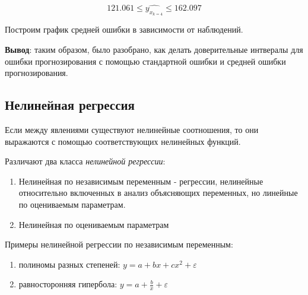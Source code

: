 \documentclass[aps,%
12pt,%
final,%
oneside,
onecolumn,%
musixtex, %
superscriptaddress,%
centertags]{article} %
\begin{document}
$$121.061 \leq \widehat{y_{x_{k=4}}} \leq162.097 $$

Построим график средней ошибки в зависимости от наблюдений.

\begin{center}
\end{center}

\textbf{Вывод}: таким образом, было разобрано, как делать доверительные интвералы для ошибки прогнозирования с помощью стандартной ошибки и средней ошибки прогнозирования.
\newpage
\subsection{Нелинейная регрессия}

Если между явлениями существуют нелинейные соотношения, то они выражаются с помощью соответствующих нелинейных функций.

Различают два класса \textit{нелинейной регрессии}:
\begin{enumerate}
	\item Нелинейная по независимым переменным - регрессии, нелинейные относительно включенных в анализ объясняющих переменных, но линейные по оцениваемым параметрам.
	\item Нелинейная по оцениваемым параметрам 
\end{enumerate}

Примеры нелинейной регрессии по независимым переменным:
\begin{enumerate}
	\item полиномы разных степеней: $ y = a + bx + cx^2+ \varepsilon $
	\item равносторонняя гипербола: $ y = a + \frac{b}{x} + \varepsilon $
\end{enumerate}
\end{document}
